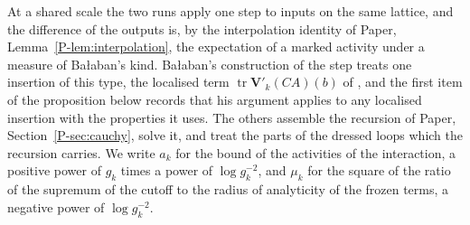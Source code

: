 \documentclass[11pt]{preprint}
\newcommand{\tr}{\operatorname{tr}}
\numberwithin{equation}{section}
\theoremstyle{definition}
\theoremstyle{remark}
\theoremstyle{plain}
\begin{document}
At a shared scale the two runs apply one step to inputs on the same lattice, and the difference of the outputs is, by the interpolation identity of Paper, Lemma~\ref{P-lem:interpolation}, the expectation of a marked activity under a measure of Ba{\l}aban's kind. Ba{\l}aban's construction of the step \cite[pp.~274--278]{BalabanCRE} treats one insertion of this type, the localised term $\tr\mathbf V'_k(CA)(b)$ of \cite[(3.37), p.~274]{BalabanCRE}, and the first item of the proposition below records that his argument applies to any localised insertion with the properties it uses. The others assemble the recursion of Paper, Section~\ref{P-sec:cauchy}, solve it, and treat the parts of the dressed loops which the recursion carries. We write $a_k$ for the bound of the activities of the interaction, a positive power of $g_k$ times a power of $\log g_k^{-2}$, and $\mu_k$ for the square of the ratio of the supremum of the cutoff to the radius of analyticity of the frozen terms, a negative power of $\log g_k^{-2}$.
\end{document}
